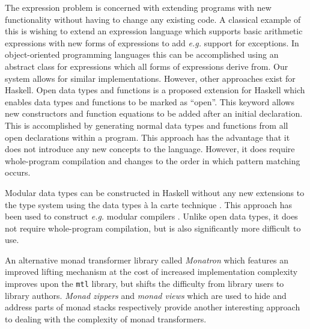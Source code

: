 \documentclass[runningheads,a4paper]{llncs}
\begin{document}

The expression problem \cite{wadler1998expression} is concerned with extending programs with new functionality without having to change any existing code. A classical example of this is wishing to extend an expression language which supports basic arithmetic expressions with new forms of expressions to add \emph{e.g.} support for exceptions.  In object-oriented programming languages this can be accomplished using an abstract class for expressions which all forms of expressions derive from. Our system allows for similar implementations. However, other approaches exist for Haskell. Open data types and functions \cite{loh2006open} is a proposed extension for Haskell which enables data types and functions to be marked as ``open''. This keyword allows new constructors and function equations to be added after an initial declaration. This is accomplished by generating normal data types and functions from all open declarations within a program. This approach has the advantage that it does not introduce any new concepts to the language. However, it does require whole-program compilation and changes to the order in which pattern matching occurs.

Modular data types can be constructed in Haskell without any new extensions to the type system using the data types \`a la carte technique \cite{swierstra2008data}. This approach has been used to construct \emph{e.g.} modular compilers \cite{day2012towards}. Unlike open data types, it does not require whole-program compilation, but is also significantly more difficult to use.  

An alternative monad transformer library called \emph{Monatron} \cite{jaskelioff2011monatron} which features an improved lifting mechanism at the cost of increased implementation complexity improves upon the \texttt{mtl} library, but shifts the difficulty from library users to library authors. \emph{Monad zippers} and \emph{monad views} \cite{schrijvers2011monads} which are used to hide and address parts of monad stacks respectively provide another interesting approach to dealing with the complexity of monad transformers.
\end{document}
